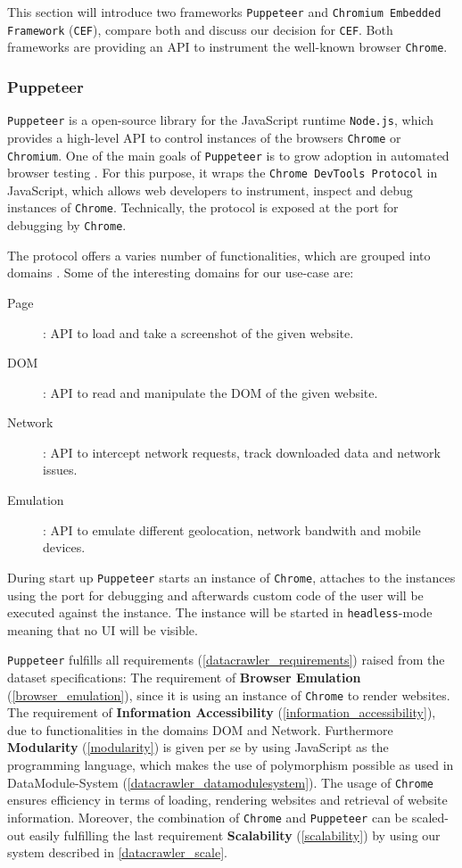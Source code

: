 This section will introduce two frameworks \texttt{Puppeteer} and \texttt{Chromium Embedded Framework} (\texttt{CEF}), compare both and discuss our decision for \texttt{CEF}. Both frameworks are providing an API to instrument the well-known browser \texttt{Chrome}.

\subsubsection{Puppeteer}
\texttt{Puppeteer} is a open-source library for the JavaScript runtime \texttt{Node.js}, which provides a high-level API to control instances of the browsers \texttt{Chrome} or \texttt{Chromium}. One of the main goals of \texttt{Puppeteer} is to grow adoption in automated browser testing \cite{PuppeteerFAQ}.  For this purpose, it wraps the \texttt{Chrome DevTools Protocol} in JavaScript, which allows web developers to instrument, inspect and debug instances of \texttt{Chrome}. Technically, the protocol is exposed at the port for debugging by \texttt{Chrome}.

The protocol offers a varies number of functionalities, which are grouped into domains \cite{DevToolsProtocol}. Some of the interesting domains for our use-case are:
\begin{description}
	\item[Page]: API to load and take a screenshot of the given website.
	\item[DOM]: API to read and manipulate the DOM of the given website.
	\item[Network]: API to intercept network requests, track downloaded data and network issues.
	\item[Emulation]: API to emulate different geolocation, network bandwith and mobile devices.
\end{description}

During start up \texttt{Puppeteer} starts an instance of \texttt{Chrome}, attaches to the instances using the port for debugging and afterwards custom code of the user will be executed against the instance. The instance will be started in \texttt{headless}-mode meaning that no UI will be visible.

\texttt{Puppeteer} fulfills all requirements (\ref{datacrawler_requirements}) raised from the dataset specifications:
The requirement of \textbf{Browser Emulation} (\ref{browser_emulation}), since it is using an instance of \texttt{Chrome} to render websites. The requirement of \textbf{Information Accessibility} (\ref{information_accessibility}), due to functionalities in the domains DOM and Network. Furthermore \textbf{Modularity} (\ref{modularity}) is given per se by using JavaScript as the programming language, which makes the use of polymorphism possible as used in DataModule-System (\ref{datacrawler_datamodulesystem}). The usage of \texttt{Chrome} ensures efficiency in terms of loading, rendering websites and retrieval of website information. Moreover, the combination of \texttt{Chrome} and \texttt{Puppeteer} can be scaled-out easily fulfilling the last requirement \textbf{Scalability} (\ref{scalability}) by using our system described in \ref{datacrawler_scale}.

